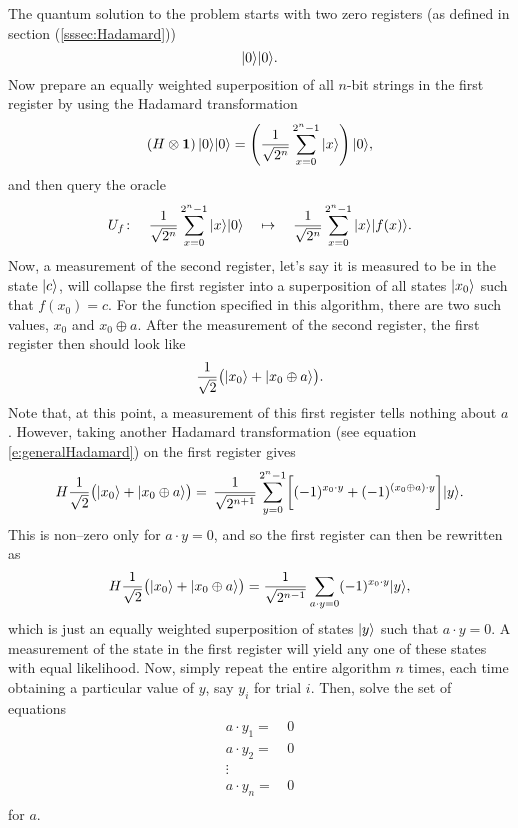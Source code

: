The quantum solution to the problem starts with two zero registers
(as defined in section (\ref{sssec:Hadamard}))
\begin{equation}
{|{0}\rangle}{|{0}\rangle}.
\end{equation}
Now prepare an equally weighted superposition of all $n$-bit strings
in the first register by using the Hadamard transformation
\begin{equation}
\left(H\otimes\bf{1}\right){|{0}\rangle}{|{0}\rangle} =
\left(\frac{1}{\sqrt{2^n}}\sum_{x=0}^{2^n-1}{|{x}\rangle}\right){|{0}\rangle},
\end{equation}
and then query the oracle
\begin{equation}
U_f\colon\quad
\frac{1}{\sqrt{2^n}}\sum_{x=0}^{2^n-1}{|{x}\rangle}{|{0}\rangle}\quad\mapsto\quad
\frac{1}{\sqrt{2^n}}\sum_{x=0}^{2^n-1}{|{x}\rangle}{|{f(x)}\rangle}.
\end{equation}
Now, a measurement of the second register, let's say it is measured
to be in the state ${|{c}\rangle}$,
will collapse the first register into a superposition of all 
states ${|{x_0}\rangle}$ such that $f(x_0)=c$.  
For the function specified in this algorithm, 
there are two such values, $x_0$ and $x_0\oplus a$.
After the measurement of the second register, 
the first register then should look like 
\begin{equation}
\frac{1}{\sqrt{2}}\bigl({|{x_0}\rangle}+{|{x_0\oplus a}\rangle}\bigr).
\end{equation}
Note that, at this point, a measurement of this first register tells
nothing about $a$.  However, taking another Hadamard transformation 
(see equation \ref{e:generalHadamard})
on the first register gives 
\begin{equation}
H \frac{1}{\sqrt{2}}\bigl({|{x_0}\rangle}+{|{x_0\oplus a}\rangle}\bigr)=
\,\frac{1}{\sqrt{2^{n+1}}}\sum_{y=0}^{2^n-1}
\biggl[(-1)^{x_0\cdot y}+(-1)^{(x_0\oplus a)\cdot y}\biggr]{|{y}\rangle}.
\end{equation}
This is non--zero only for $a\cdot y=0$, and so the first register
can then be rewritten as
\begin{equation}
H \frac{1}{\sqrt{2}}\bigl({|{x_0}\rangle}+{|{x_0\oplus a}\rangle}\bigr)
=\frac{1}{\sqrt{2^{n-1}}}\sum_{a\cdot y=0}
(-1)^{x_0\cdot y}{|{y}\rangle},
\end{equation}
which is just an equally weighted superposition of states
${|{y}\rangle}$ such that $a\cdot y = 0$.
A measurement of the state in the first register will yield
any one of these states with equal likelihood.  Now, simply
repeat the entire algorithm $n$ times, each time obtaining
a particular value of $y$, say $y_i$ for trial $i$.
Then, solve the set of equations
\begin{equation}
\begin{split}
a\cdot y_1 =&\, 0\\
a\cdot y_2 =&\, 0\\
\vdots\quad&\\
a\cdot y_n =&\, 0\\
\end{split}
\end{equation}
for $a$.

